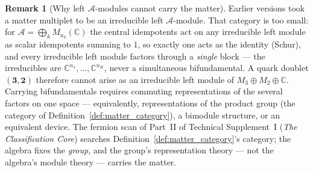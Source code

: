 \documentclass[11pt]{article}
\theoremstyle{definition}
\newtheorem{remark}[theorem]{Remark}
\newcommand{\TSI}{Technical Supplement~I (\emph{The Classification Core})}
\begin{document}
\begin{remark}[Why left $\mathcal{A}$-modules cannot carry the matter]
\label{rem:no_left_modules}
Earlier versions took a matter multiplet to be an irreducible left
$\mathcal{A}$-module.  That category is too small: for
$\mathcal{A} = \bigoplus_k M_{n_k}(\mathbb{C})$ the central idempotents
act on any irreducible left module as scalar idempotents summing to
$1$, so exactly one acts as the identity (Schur), and every irreducible
left module factors through a \emph{single} block --- the irreducibles
are $\mathbb{C}^{n_1}, \ldots, \mathbb{C}^{n_K}$, never a simultaneous
bifundamental.  A quark doublet $(\mathbf{3}, \mathbf{2})$ therefore
cannot arise as an irreducible left module of
$M_3 \oplus M_2 \oplus \mathbb{C}$.  Carrying bifundamentals requires
commuting representations of the several factors on one space ---
equivalently, representations of the product group (the category of
Definition~\ref{def:matter_category}), a bimodule structure, or an
equivalent device.  The fermion scan of
Part~II of \TSI{} searches Definition~\ref{def:matter_category}'s
category; the algebra fixes the \emph{group}, and the group's
representation theory --- not the algebra's module theory --- carries
the matter.
\end{remark}
\end{document}
